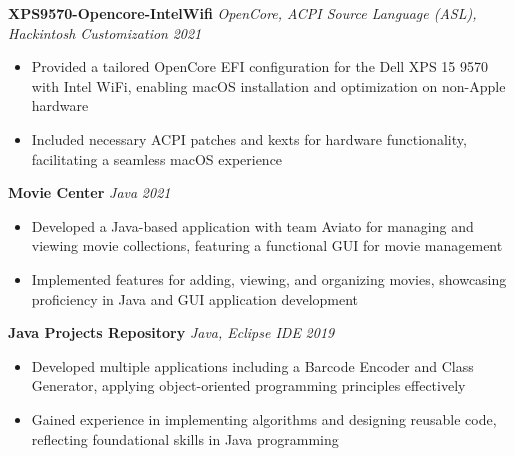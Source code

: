\documentclass[letterpaper]{article}
\newenvironment{tightitemize}{%
  \begin{itemize}\small\setlength{\baselineskip}{0.95\baselineskip}\itemsep -1mm%
}{\end{itemize}}
\begin{document}
    {\textbf{XPS9570-Opencore-IntelWifi}} {\sl OpenCore, ACPI Source Language (ASL), Hackintosh Customization} \hfill \textsl{2021}\\
    \vspace{-2mm}
    \begin{tightitemize} \itemsep -1mm

        \item Provided a tailored OpenCore EFI configuration for the Dell XPS 15 9570 with Intel WiFi, enabling macOS installation and optimization on non-Apple hardware
        
        \item Included necessary ACPI patches and kexts for hardware functionality, facilitating a seamless macOS experience
        
    \end{tightitemize}
    \vspace{-2mm}

    {\textbf{Movie Center}} {\sl Java} \hfill \textsl{2021}\\
    \vspace{-2mm}
    \begin{tightitemize} \itemsep -1mm

        \item Developed a Java-based application with team Aviato for managing and viewing movie collections, featuring a functional GUI for movie management
        
        \item Implemented features for adding, viewing, and organizing movies, showcasing proficiency in Java and GUI application development
        
    \end{tightitemize}
    \vspace{-2mm}

    {\textbf{Java Projects Repository}} {\sl Java, Eclipse IDE} \hfill \textsl{2019}\\
    \vspace{-2mm}
    \begin{tightitemize} \itemsep -1mm

        \item Developed multiple applications including a Barcode Encoder and Class Generator, applying object-oriented programming principles effectively
        
        \item Gained experience in implementing algorithms and designing reusable code, reflecting foundational skills in Java programming
        
    \end{tightitemize}
    \vspace{-2mm}
\end{document}
